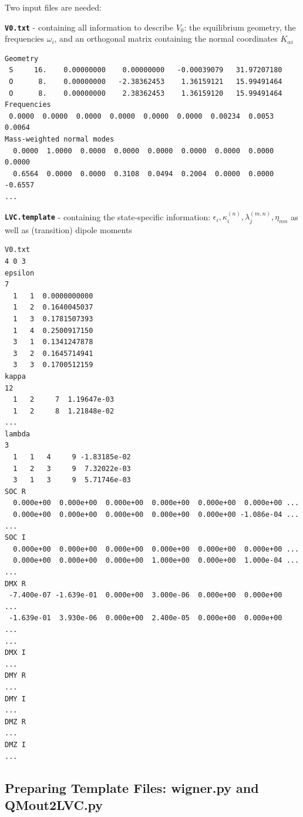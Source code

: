 \documentclass[a4paper,10pt,DIV=15,openany,twoside=false]{scrbook}
\newcommand{\ttt}[1]{\textbf{\texttt{#1}}}
\newenvironment{example}{
  \setlength{\OuterFrameSep}{3pt}
  \vspace{0mm}
  \definecolor{shadecolor}{HTML}{E4F4FF}
  \begin{shaded}
}{
  \end{shaded}
}
\begin{document}
Two input files are needed:

\ttt{V0.txt} - containing all information to describe $V_0$: the equilibrium geometry, the frequencies $\omega_i$, and an orthogonal matrix containing the normal coordinates $K_{\alpha i}$

\begin{example}
\begin{verbatim}
Geometry
 S     16.    0.00000000    0.00000000   -0.00039079   31.97207180
 O      8.    0.00000000   -2.38362453    1.36159121   15.99491464
 O      8.    0.00000000    2.38362453    1.36159120   15.99491464
Frequencies
 0.0000  0.0000  0.0000  0.0000  0.0000  0.0000  0.00234  0.0053  0.0064
Mass-weighted normal modes
  0.0000  1.0000  0.0000  0.0000  0.0000  0.0000  0.0000  0.0000  0.0000
  0.6564  0.0000  0.0000  0.3108  0.0494  0.2004  0.0000  0.0000 -0.6557
...
\end{verbatim}
\end{example}

\ttt{LVC.template} - containing the state-specific information: $\epsilon_i, \kappa_i^{(n)}, \lambda_j^{(m,n)}, \eta_{mn}$ as well as (transition) dipole moments

\begin{example}
\begin{verbatim}
V0.txt
4 0 3 
epsilon
7
  1   1  0.0000000000
  1   2  0.1640045037
  1   3  0.1781507393
  1   4  0.2500917150
  3   1  0.1341247878
  3   2  0.1645714941
  3   3  0.1700512159
kappa
12
  1   2     7  1.19647e-03
  1   2     8  1.21848e-02
...
lambda
3
  1   1   4     9 -1.83185e-02
  1   2   3     9  7.32022e-03
  3   1   3     9  5.71746e-03
SOC R
  0.000e+00  0.000e+00  0.000e+00  0.000e+00  0.000e+00  0.000e+00 ...
  0.000e+00  0.000e+00  0.000e+00  0.000e+00  0.000e+00 -1.086e-04 ...
...
SOC I
  0.000e+00  0.000e+00  0.000e+00  0.000e+00  0.000e+00  0.000e+00 ...
  0.000e+00  0.000e+00  0.000e+00  1.000e+00  0.000e+00  1.000e-04 ...
...
DMX R
 -7.400e-07 -1.639e-01  0.000e+00  3.000e-06  0.000e+00  0.000e+00  ...
 -1.639e-01  3.930e-06  0.000e+00  2.400e-05  0.000e+00  0.000e+00  ...
...
DMX I
...
DMY R
...
DMY I
...
DMZ R
...
DMZ I
...
\end{verbatim}
\end{example}

\subsection{Preparing Template Files: wigner.py and QMout2LVC.py}\label{sec:QMout2LVC.py}
\end{document}
